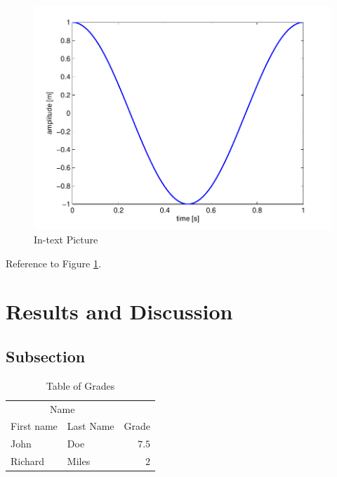 \documentclass[fleqn,10pt]{SelfArx} %
\begin{document}
\lipsum[9] %

\begin{figure}[ht]\centering
\includegraphics[width=\linewidth]{results}
\caption{In-text Picture}
\label{fig:results}
\end{figure}

Reference to Figure \ref{fig:results}.


\section{Results and Discussion}

\lipsum[10] %

\subsection{Subsection}

\lipsum[11] %

\begin{table}[hbt]
\caption{Table of Grades}
\centering
\begin{tabular}{llr}
\toprule
\multicolumn{2}{c}{Name} \\
\cmidrule(r){1-2}
First name & Last Name & Grade \\
\midrule
John & Doe & $7.5$ \\
Richard & Miles & $2$ \\
\bottomrule
\end{tabular}
\label{tab:label}
\end{table}
\end{document}

